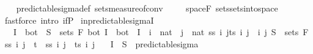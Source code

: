 \begin{isabellebody}
%
\isadelimproof
\ \ %
\endisadelimproof
%
\isatagproof
{}\isamarkupfalse%
\ predictable{\isacharunderscore}{\kern0pt}sigma{\isacharunderscore}{\kern0pt}def\ sets{\isacharunderscore}{\kern0pt}measure{\isacharunderscore}{\kern0pt}of{\isacharunderscore}{\kern0pt}conv\ \isanewline
\ \ \isamarkupfalse%
\ space{\isacharunderscore}{\kern0pt}F\ sets{\isachardot}{\kern0pt}sets{\isacharunderscore}{\kern0pt}into{\isacharunderscore}{\kern0pt}space\isanewline
\ \ \isamarkupfalse%
\ {\isacharparenleft}{\kern0pt}fastforce\ intro{\isacharbang}{\kern0pt}{\isacharcolon}{\kern0pt}\ if{\isacharunderscore}{\kern0pt}P{\isacharparenright}{\kern0pt}%
\endisatagproof
{\isafoldproof}%
%
\isadelimproof
\isanewline
%
\endisadelimproof
\isanewline
{}\isamarkupfalse%
\ in{\isacharunderscore}{\kern0pt}predictable{\isacharunderscore}{\kern0pt}sigmaI{\isacharcolon}{\kern0pt}\isanewline
\ \ \ {\isachardoublequoteopen}I\ {\isacharequal}{\kern0pt}\ {\isacharbraceleft}{\kern0pt}bot{\isacharbraceright}{\kern0pt}\ {\isasymLongrightarrow}\ S\ {\isasymin}\ sets\ {\isacharparenleft}{\kern0pt}F\ bot{\isacharparenright}{\kern0pt}{\isachardoublequoteclose}\ {\isachardoublequoteopen}I\ {\isasymnoteq}\ {\isacharbraceleft}{\kern0pt}bot{\isacharbraceright}{\kern0pt}\ {\isasymLongrightarrow}\ I\ {\isacharequal}{\kern0pt}\ {\isacharparenleft}{\kern0pt}{\isasymUnion}i\ {\isacharcolon}{\kern0pt}{\isacharcolon}{\kern0pt}\ nat{\isachardot}{\kern0pt}\ {\isasymInter}\ j\ {\isacharcolon}{\kern0pt}{\isacharcolon}{\kern0pt}\ nat{\isachardot}{\kern0pt}\ {\isacharbraceleft}{\kern0pt}{\isacharparenleft}{\kern0pt}ss\ i\ j{\isacharparenright}{\kern0pt}{\isacharless}{\kern0pt}{\isachardot}{\kern0pt}{\isachardot}{\kern0pt}{\isacharparenleft}{\kern0pt}ts\ i\ j{\isacharparenright}{\kern0pt}{\isacharbraceright}{\kern0pt}{\isacharparenright}{\kern0pt}\ {\isasymand}\ {\isacharparenleft}{\kern0pt}{\isasymforall}i\ j{\isachardot}{\kern0pt}\ S\ {\isasymin}\ sets\ {\isacharparenleft}{\kern0pt}F\ {\isacharparenleft}{\kern0pt}ss\ i\ j\ {\isacharcolon}{\kern0pt}{\isacharcolon}{\kern0pt}\ {\isacharprime}{\kern0pt}t{\isacharparenright}{\kern0pt}{\isacharparenright}{\kern0pt}\ {\isasymand}\ ss\ i\ j\ {\isacharless}{\kern0pt}\ ts\ i\ j{\isacharparenright}{\kern0pt}{\isachardoublequoteclose}\isanewline
\ \ \ {\isachardoublequoteopen}I\ {\isasymtimes}\ S\ {\isasymin}\ predictable{\isacharunderscore}{\kern0pt}sigma{\isachardoublequoteclose}\isanewline
%
\isadelimproof
%
\endisadelimproof
%
\isatagproof
{}\isamarkupfalse%

\end{isabellebody}
